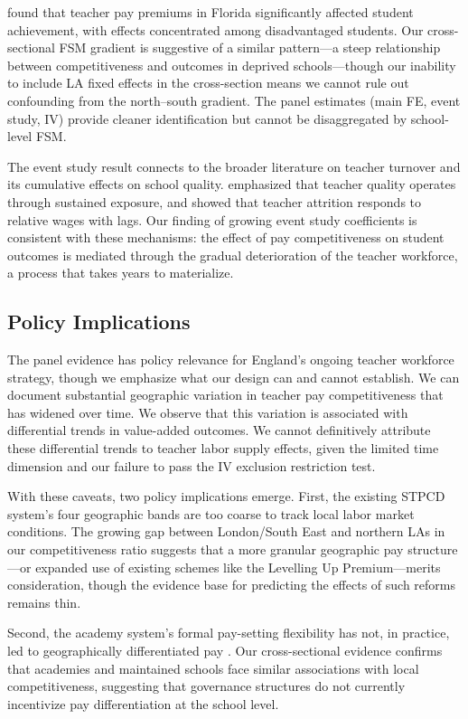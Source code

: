 \documentclass[12pt]{article}
\begin{document}
\citet{hendricks2014relative} found that teacher pay premiums in Florida significantly affected student achievement, with effects concentrated among disadvantaged students. Our cross-sectional FSM gradient is suggestive of a similar pattern---a steep relationship between competitiveness and outcomes in deprived schools---though our inability to include LA fixed effects in the cross-section means we cannot rule out confounding from the north--south gradient. The panel estimates (main FE, event study, IV) provide cleaner identification but cannot be disaggregated by school-level FSM.

The event study result connects to the broader literature on teacher turnover and its cumulative effects on school quality. \citet{rivkin2005teachers} emphasized that teacher quality operates through sustained exposure, and \citet{gilpin2011reevaluating} showed that teacher attrition responds to relative wages with lags. Our finding of growing event study coefficients is consistent with these mechanisms: the effect of pay competitiveness on student outcomes is mediated through the gradual deterioration of the teacher workforce, a process that takes years to materialize.

\subsection{Policy Implications}

The panel evidence has policy relevance for England's ongoing teacher workforce strategy, though we emphasize what our design can and cannot establish. We can document substantial geographic variation in teacher pay competitiveness that has widened over time. We observe that this variation is associated with differential trends in value-added outcomes. We cannot definitively attribute these differential trends to teacher labor supply effects, given the limited time dimension and our failure to pass the IV exclusion restriction test.

With these caveats, two policy implications emerge. First, the existing STPCD system's four geographic bands are too coarse to track local labor market conditions. The growing gap between London/South East and northern LAs in our competitiveness ratio suggests that a more granular geographic pay structure---or expanded use of existing schemes like the Levelling Up Premium---merits consideration, though the evidence base for predicting the effects of such reforms remains thin.

Second, the academy system's formal pay-setting flexibility has not, in practice, led to geographically differentiated pay \citep{britton2016teacher}. Our cross-sectional evidence confirms that academies and maintained schools face similar associations with local competitiveness, suggesting that governance structures do not currently incentivize pay differentiation at the school level.
\end{document}
